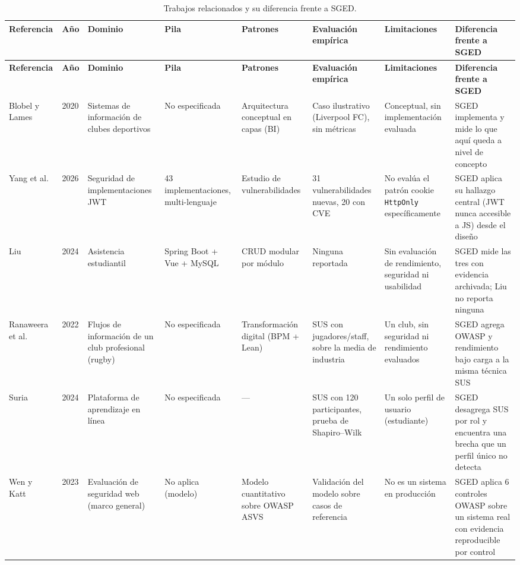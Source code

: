 \documentclass[11pt,a4paper]{article}
\begin{document}
\begin{longtable}{p{2.0cm} p{0.7cm} p{1.8cm} p{1.9cm} p{1.9cm} p{2.4cm} p{2.2cm} p{2.6cm}}
\caption{Trabajos relacionados y su diferencia frente a SGED.\label{tab:trabajos-relacionados}}\\
\toprule
\textbf{Referencia} & \textbf{Año} & \textbf{Dominio} & \textbf{Pila} & \textbf{Patrones} & \textbf{Evaluación empírica} & \textbf{Limitaciones} & \textbf{Diferencia frente a SGED} \\
\midrule
\endfirsthead
\toprule
\textbf{Referencia} & \textbf{Año} & \textbf{Dominio} & \textbf{Pila} & \textbf{Patrones} & \textbf{Evaluación empírica} & \textbf{Limitaciones} & \textbf{Diferencia frente a SGED} \\
\midrule
\endhead
\scriptsize
Blobel y Lames~\cite{blobel2020cis} & 2020 & Sistemas de información de clubes deportivos & No especificada & Arquitectura conceptual en capas (BI) & Caso ilustrativo (Liverpool FC), sin métricas & Conceptual, sin implementación evaluada & SGED implementa y mide lo que aquí queda a nivel de concepto \\
Yang et al.~\cite{yang2026jwt} & 2026 & Seguridad de implementaciones JWT & 43 implementaciones, multi-lenguaje & Estudio de vulnerabilidades & 31 vulnerabilidades nuevas, 20 con CVE & No evalúa el patrón cookie \texttt{HttpOnly} específicamente & SGED aplica su hallazgo central (JWT nunca accesible a JS) desde el diseño \\
Liu~\cite{liu2024attendance} & 2024 & Asistencia estudiantil & Spring Boot + Vue + MySQL & CRUD modular por módulo & Ninguna reportada & Sin evaluación de rendimiento, seguridad ni usabilidad & SGED mide las tres con evidencia archivada; Liu no reporta ninguna \\
Ranaweera et al.~\cite{ranaweera2022rugby} & 2022 & Flujos de información de un club profesional (rugby) & No especificada & Transformación digital (BPM + Lean) & SUS con jugadores/staff, sobre la media de industria & Un club, sin seguridad ni rendimiento evaluados & SGED agrega OWASP y rendimiento bajo carga a la misma técnica SUS \\
Suria~\cite{suria2024sus} & 2024 & Plataforma de aprendizaje en línea & No especificada & --- & SUS con 120 participantes, prueba de Shapiro--Wilk & Un solo perfil de usuario (estudiante) & SGED desagrega SUS por rol y encuentra una brecha que un perfil único no detecta \\
Wen y Katt~\cite{wenkatt2023owasp} & 2023 & Evaluación de seguridad web (marco general) & No aplica (modelo) & Modelo cuantitativo sobre OWASP ASVS & Validación del modelo sobre casos de referencia & No es un sistema en producción & SGED aplica 6 controles OWASP sobre un sistema real con evidencia reproducible por control \\

\end{longtable}
\end{document}
